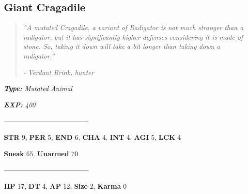 \documentclass[11pt,a4paper,twocolumn]{book}
\begin{document}
	\clearpage
	\subsection*{Giant Cragadile}
	\begin{quote}
		\emph{``A mutated Cragadile, a variant of Radigator is not much stronger than a radigator, but it has significantly higher defenses considering it is made of stone. So, taking it down will take a bit longer than taking down a radigator.''}
		
		\emph{-	Verdant Brink, hunter}
	\end{quote}
	
	\emph{\textbf{Type:} Mutated Animal}
	
	\emph{\textbf{EXP:} 400}
	
%		
%	
%		

	--------------------------------------

\noindent
\textbf{STR} 9, \textbf{PER} 5, \textbf{END} 6, \textbf{CHA} 4, \textbf{INT} 4, \textbf{AGI} 5, \textbf{LCK} 4

\noindent
\textbf{Sneak} 65, \textbf{Unarmed} 70 %

--------------------------------------

\noindent
\textbf{HP} 17, \textbf{DT} 4, \textbf{AP} 12, \textbf{Size} 2, \textbf{Karma} 0
\end{document}

